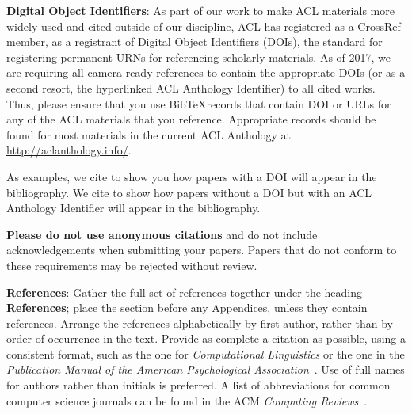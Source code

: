\documentclass[11pt,a4paper]{article}
\begin{document}
\textbf{Digital Object Identifiers}:  As part of our work to make ACL
materials more widely used and cited outside of our discipline, ACL
has registered as a CrossRef member, as a registrant of Digital Object
Identifiers (DOIs), the standard for registering permanent URNs for
referencing scholarly materials.  As of 2017, we are requiring all
camera-ready references to contain the appropriate DOIs (or as a
second resort, the hyperlinked ACL Anthology Identifier) to all cited
works.  Thus, please ensure that you use Bib\TeX records that contain
DOI or URLs for any of the ACL materials that you reference.
Appropriate records should be found for most materials in the current
ACL Anthology at \url{http://aclanthology.info/}.

As examples, we cite \cite{P16-1001} to show you how papers with a DOI
will appear in the bibliography.  We cite \cite{C14-1001} to show how
papers without a DOI but with an ACL Anthology Identifier will appear
in the bibliography.  


\textbf{Please do not use anonymous citations} and do not include
acknowledgements when submitting your papers. Papers that do not
conform to these requirements may be rejected without review.

\textbf{References}: Gather the full set of references together under
the heading {\bf References}; place the section before any Appendices,
unless they contain references. Arrange the references alphabetically
by first author, rather than by order of occurrence in the text.
Provide as complete a citation as possible, using a consistent format,
such as the one for {\em Computational Linguistics\/} or the one in the 
{\em Publication Manual of the American 
Psychological Association\/}~\cite{APA:83}.  Use of full names for
authors rather than initials is preferred.  A list of abbreviations
for common computer science journals can be found in the ACM 
{\em Computing Reviews\/}~\cite{ACM:83}.
\end{document}
